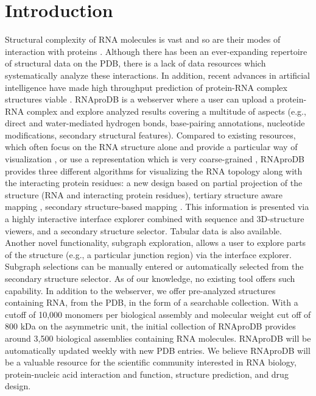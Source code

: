 \section{Introduction}
Structural complexity of RNA molecules is vast and so are their modes of interaction with proteins \citep{jones2001protein}. Although there has been an ever-expanding repertoire of structural data on the PDB, there is a lack of data resources which systematically analyze these interactions. In addition, recent advances in artificial intelligence have made high throughput prediction of protein-RNA complex structures viable \citep{Abramson2024, watson2023novo}. RNAproDB is a webserver where a user can upload a protein-RNA complex and explore analyzed results covering a multitude of aspects (e.g., direct and water-mediated hydrogen bonds, base-pairing annotations, nucleotide modifications, secondary structural features). Compared to existing resources, which often focus on the RNA structure alone and provide a particular way of visualization \citep{Kerpedjiev2015, Yang2003}, or use a representation which is very coarse-grained \citep{chojnowski2014rna}, RNAproDB provides three different algorithms for visualizing the RNA topology along with the interacting protein residues: a new design based on partial projection of the structure (RNA and interacting protein residues), tertiary structure aware mapping \citep{Mitra2024rnascape}, secondary structure-based mapping \citep{Kerpedjiev2015}. This information is presented via a highly interactive interface explorer combined with sequence and 3D-structure viewers, and a secondary structure selector. Tabular data is also available. Another novel functionality, subgraph exploration, allows a user to explore parts of the structure (e.g., a particular junction region) via the interface explorer. Subgraph selections can be manually entered or automatically selected from the secondary structure selector. As of our knowledge, no existing tool offers such capability. In addition to the webserver, we offer pre-analyzed structures containing RNA, from the PDB, in the form of a searchable collection. With a cutoff of 10,000 monomers per biological assembly and molecular weight cut off of 800 kDa on the asymmetric unit, the initial collection of RNAproDB provides around 3,500 biological assemblies containing RNA molecules. RNAproDB will be automatically updated weekly with new PDB entries. We believe RNAproDB will be a valuable resource for the scientific community interested in RNA biology, protein-nucleic acid interaction and function, structure prediction, and drug design.

